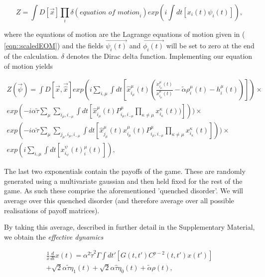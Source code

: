 \documentclass[sigconf,anonymous]{aamas}
\newcommand{\xmu}[2]{x_{#1_#2}^{#2}(t)}
\newcommand{\payoff}[2]{P^{#2}_{#1_#2, #1_{-#2}}}
\newcommand{\dxmu}[1]{\dot{x}_{#1_\mu}^{\mu} (t)}
\newcommand{\hxmu}[1]{\hat{x}_{#1_\mu}^{\mu} (t)}
\newcommand{\talpha}{\tilde{\alpha}}
\newcommand{\ttau}{\tilde{\tau}}
\newcommand{\htau}{\hat{\tau}}
\begin{document}
\begin{equation}
	Z = \int D[\Vec{x}] \prod_i \delta(\textit{equation of motion}_i) exp(i
	\int dt[x_i(t) \psi_i(t)]), 
\end{equation}

where the equations of motion are the Lagrange equations of motion given in (
\ref{eqn::scaledEOM}) and
the fields $\Vec{\psi_i(t)}$ and $\Vec{\phi_i(t)}$ will be set to zero at the end of the
calculation. $\delta$ denotes the Dirac delta function. Implementing our equation of motion yields

\begin{equation}
	\begin{split}
	Z(\Vec{\psi}) = \int D[\Vec{x}, \Vec{\hat{x}}] exp( i \sum_{i, \mu} \int dt [ \hxmu{i} (\frac{\dxmu{i}}{\xmu{i}{\mu}} - \talpha \rho_i^\mu (t) - h_i^\mu (t))]) \times \\ exp(-i \alpha \ttau \sum_{\mu} \sum_{i_\mu, i_{-\mu}} \int dt [\hxmu{i} \payoff{i}{\mu} \prod_{\kappa \neq \mu} \xmu{i}{\kappa} )])) 
    \times \\ exp(-i \alpha \ttau \sum_{\mu} \sum_{j_\mu, i_\mu, i_{-\mu}} \int dt [\hxmu{j}  \xmu{i}{\mu} \payoff{i}{\mu} \prod_{\kappa \neq \mu} \xmu{i}{\kappa}])) 
	\times \\ exp(i \sum_{i, \mu}
	\int dt[\xmu{i} \psi^\mu_i(t)]),
\end{split}
\end{equation}

The last two exponentials contain the payoffs of the game. These are randomly generated using a multivariate gaussian and then held fixed for the rest of the game. As such these comprise the aforementioned 'quenched disorder'. We will average over this quenched disorder (and therefore average over all possible realisations of payoff matrices).

By taking this average, described in further detail in the Supplementary Material, we obtain the \textit{effective dynamics}

\begin{equation}
    \label{eqn::EffectiveDynamics}
    \begin{split}
            \frac{1}{x} \frac{d}{dt} x(t) = \alpha^2 \ttau^2 \Gamma \int dt' \left [G(t, t')C^{p - 2}(t, t') x(t') \right ]\\ + \sqrt{2} \alpha \ttau \eta_1(t) + \sqrt{2} \alpha \htau \eta_0(t) + \talpha \rho(t), 
    \end{split}
\end{equation}
\end{document}
